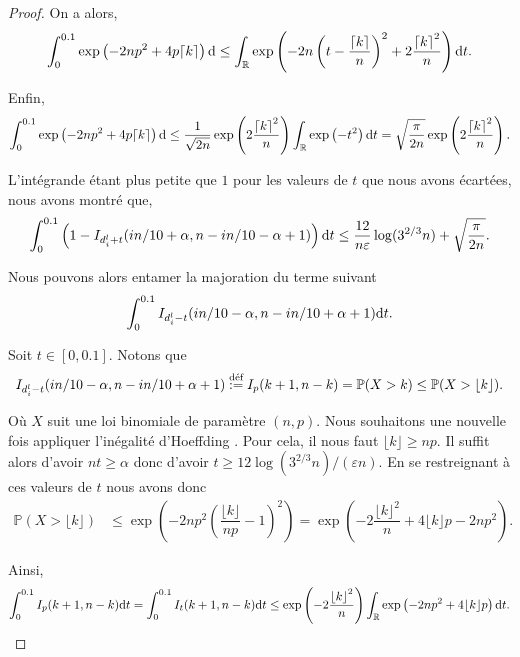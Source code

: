 \begin{proof}
    On a alors,
    \[
        \int_0^{0.1}\exp\left( -2np^2 + 4p{\lceil k \rceil} \right)\mathrm{d} \leq  \int_{\mathbb{R}}\exp\left( -2n\left(t - \dfrac{{\lceil k \rceil}}{n}\right)^2 + 2 \dfrac{{\lceil k \rceil}^2}{n} \right)\mathrm{d} t.
    \]

    Enfin,
    \[
        \int_0^{0.1}\exp\left( -2np^2 + 4p{\lceil k \rceil} \right)\mathrm{d} \leq \dfrac{1}{\sqrt{2n}}\exp\left( 2 \dfrac{{\lceil k \rceil}^2}{n} \right) \int_{\mathbb{R}}\exp\left( -t^2 \right)\mathrm{d} t = \sqrt{\dfrac{\pi}{2n}}\exp\left( 2 \dfrac{{\lceil k \rceil}^2}{n} \right).
    \]

    L'intégrande étant plus petite que \(1\) pour les valeurs de \(t\) que nous avons écartées, nous avons montré que,
    \begin{align}
        \int_{0}^{0.1}\left( 1 - I_{d_i^l + t}(in/10 + \alpha, n - in/10 -  \alpha + 1) \right) \mathrm{d} t \leq \dfrac{12}{n\varepsilon}\log(3^{2/3}n) + \sqrt{\dfrac{\pi}{2n}}.
    \end{align}

    Nous pouvons alors entamer la majoration du terme suivant 
    \[
        \int_{0}^{0.1}I_{d_i^l - t}(in/10 - \alpha, n - in/10 +  \alpha + 1) \mathrm{d} t.    
    \]

    \newcommand{\kfloor}{{\lfloor k \rfloor}}
    Soit \(t \in [0, 0.1]\). Notons que 
    \[
        \begin{array}[]{rcl}
            I_{d_i^l - t}(in/10 - \alpha, n - in/10 +  \alpha + 1) \overset{\text{déf}}{:=} I_{p}(k+1, n - k) = \mathbb P(X > k) \leq \mathbb P(X > \kfloor).
        \end{array}    
    \]

    Où \(X\) suit une loi binomiale de paramètre \((n,p)\). Nous souhaitons une nouvelle fois appliquer l'inégalité d'{\sc Hoeffding} \cite{10.5555/3134214}. Pour cela, il nous faut \(\kfloor \geq np\). Il suffit alors d'avoir \(nt \geq \alpha\) donc d'avoir \(t \geq 12\log(3^{2/3}n)/(\varepsilon n)\). En se restreignant à ces valeurs de \(t\) nous avons donc 
    \begin{align*}
        \mathbb P(X > \kfloor) & \leq \exp\left( -2np^2\left( \dfrac{\kfloor}{np} - 1 \right)^2 \right) = \exp\left(  -2\dfrac{\kfloor^2}{n} +4\kfloor p  - 2np^2  \right).
    \end{align*}

    Ainsi,
    \begin{align*}
        \int_0^{0.1} I_{p}(k+1, n - k) \dt t = \int_{0}^{0.1} I_{t}(k+1, n - k) \dt t \leq \exp\left( -2\dfrac{\kfloor^2}{n} \right) \int_\R \exp\left( -2np^2 + 4\kfloor p \right)\dt t.
    \end{align*}


\end{proof}
